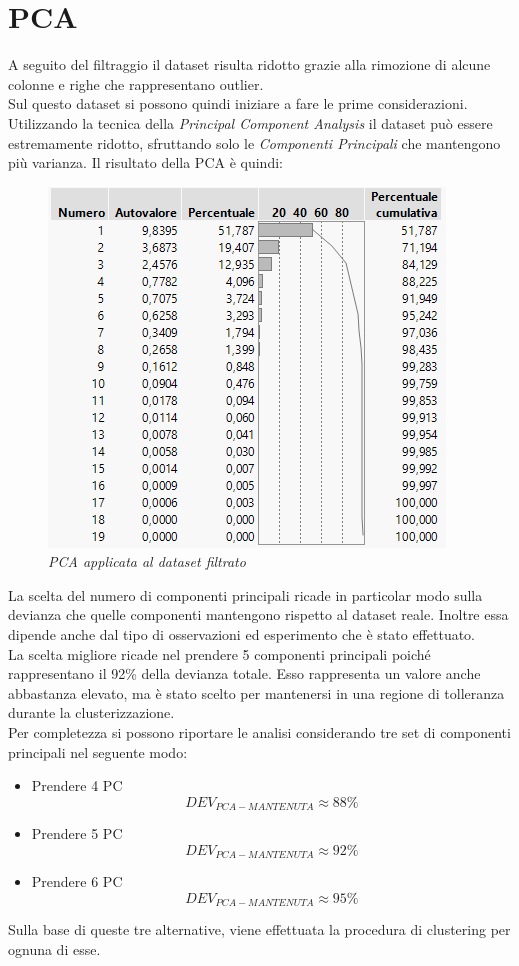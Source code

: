 \section{PCA}
A seguito del filtraggio il dataset risulta ridotto grazie alla rimozione di alcune colonne e righe che rappresentano outlier.
\\Sul questo dataset si possono quindi iniziare a fare le prime considerazioni.
\\Utilizzando la tecnica della \textit{Principal Component Analysis} il dataset può essere estremamente ridotto, sfruttando solo le \textit{Componenti Principali} che mantengono più varianza. Il risultato della PCA è quindi:
\begin{figure}[H]
	\centering
	\includegraphics{img/hw1/pca.png}
	\caption{\textit{PCA applicata al dataset filtrato}}
\end{figure}
La scelta del numero di componenti principali ricade in particolar modo sulla devianza che quelle componenti mantengono rispetto al dataset reale. Inoltre essa dipende anche dal tipo di osservazioni ed esperimento che è stato effettuato.
\\La scelta migliore ricade nel prendere 5 componenti principali poiché rappresentano il 92\% della devianza totale. Esso rappresenta un valore anche abbastanza elevato, ma è stato scelto per mantenersi in una regione di tolleranza durante la clusterizzazione. 
\\Per completezza si possono riportare le analisi considerando tre set di componenti principali nel seguente modo:
\begin{itemize}
	\item Prendere 4 PC
	\begin{equation*}
		DEV_{PCA-MANTENUTA} \approx 88 \%
	\end{equation*}
	\item Prendere 5 PC
	\begin{equation*}
			DEV_{PCA-MANTENUTA} \approx 92 \%
	\end{equation*}
	\item Prendere 6 PC
	\begin{equation*}
			DEV_{PCA-MANTENUTA} \approx 95 \%
	\end{equation*}
\end{itemize}
Sulla base di queste tre alternative, viene effettuata la procedura di clustering per ognuna di esse.

